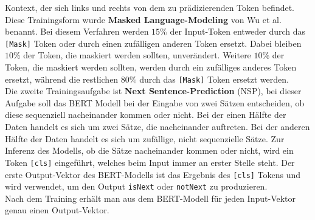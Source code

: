 \documentclass[12pt,letterpaper,ngerman]{article}
\begin{document}
Kontext, der sich links und rechts von dem zu prädizierenden Token befindet.
Diese Trainingsform wurde {\bf Masked Language-Modeling} von 
Wu et al. benannt.
Bei diesem Verfahren werden $15 \%$ der Input-Token entweder durch das
\verb|[Mask]| Token oder durch einen zufälligen anderen Token ersetzt.
Dabei bleiben $10 \%$ der Token, die maskiert werden sollten,
unverändert. Weitere $10 \%$ der Token, die maskiert werden sollten,
werden durch ein zufälliges anderes Token ersetzt, während die
restlichen $80 \%$ durch das \verb|[Mask]| Token ersetzt werden.\\
Die zweite Trainingsaufgabe ist {\bf Next Sentence-Prediction} (NSP),
bei dieser Aufgabe soll das BERT Modell bei der Eingabe von zwei Sätzen 
entscheiden, ob diese sequenziell nacheinander kommen oder nicht.
Bei der einen Hälfte der Daten handelt es sich um zwei Sätze, die nacheinander 
auftreten. Bei der anderen Hälfte der Daten handelt es sich um zufällige,
nicht sequenzielle Sätze. Zur Inferenz des Modells, ob die Sätze
nacheinander kommen oder nicht, wird ein Token \verb|[cls]| 
eingeführt, welches beim Input immer an erster Stelle steht.
Der erste Output-Vektor des BERT-Modells ist das Ergebnis des
\verb|[cls]| Tokens und wird verwendet, um den Output
\verb|isNext| oder \verb|notNext| zu produzieren.\\
Nach dem Training erhält man aus dem BERT-Modell für jeden 
Input-Vektor genau einen Output-Vektor. 
\end{document}
